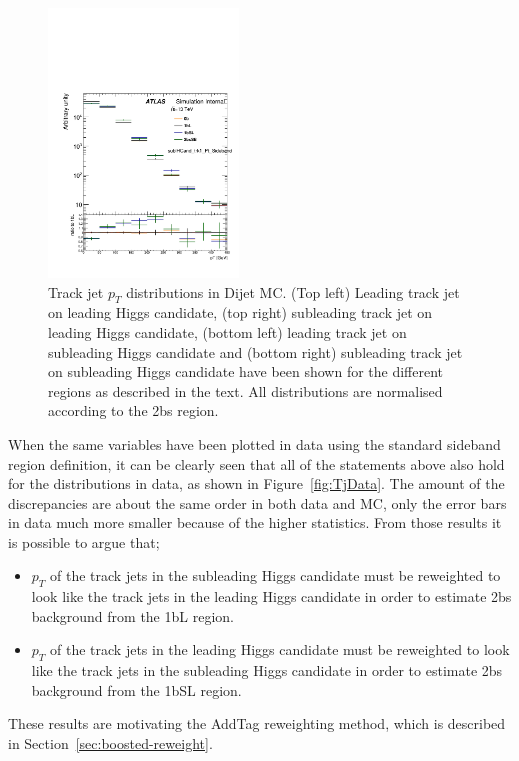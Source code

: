 \begin{figure}[htbp!]
\begin{center}
\includegraphics[width=0.45\textwidth,angle=-90]{figures/boosted/AppendixDijetMC/sublHCand_trk1_Pt_SidebandwoPr_log.pdf}
 \caption{Track jet $p_{T}$ distributions in Dijet MC. (Top left) Leading track jet on leading Higgs candidate, (top right) subleading track jet on leading Higgs candidate, (bottom left) leading track jet on subleading Higgs candidate and (bottom right) subleading track jet on subleading Higgs candidate have been shown for the different regions as described in the text. All distributions are normalised according to the 2bs region.}
\label{fig:TjMC}
\end{center}
\end{figure}

When the same variables have been plotted in data using the standard sideband region definition, it can be clearly seen that all of the statements above also hold for the distributions in data, as shown in Figure~\ref{fig:TjData}. The amount of the discrepancies are about the same order in both data and MC, only the error bars in data much more smaller because of the higher statistics. 
From those results it is possible to argue that; 
\begin{itemize}
\item$p_{T}$ of the track jets in the subleading Higgs candidate must be reweighted to look like the track jets in the leading Higgs candidate in order to estimate 2bs background from the 1bL region. 
\item$p_{T}$ of the track jets in the leading Higgs candidate must be reweighted to look like the track jets in the subleading Higgs candidate in order to estimate 2bs background from the 1bSL region. 
\end{itemize}  
These results are motivating the AddTag reweighting method, which is described in Section~\ref{sec:boosted-reweight}. 

